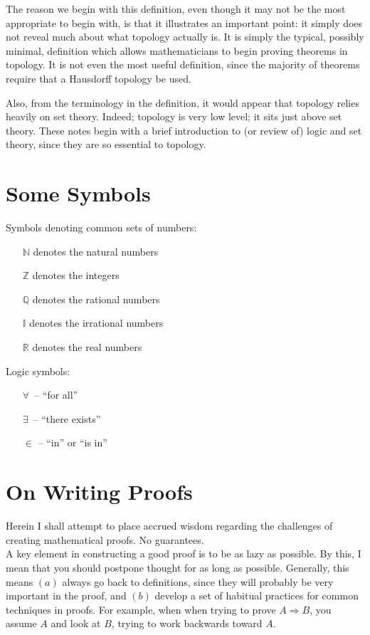 \documentclass[12pt]{report}
\newcommand{\fall}{\forall\,}
\newcommand{\exst}{\exists\,}
\newcommand{\reals}{\mathbb{R}}
\newcommand{\naturals}{\mathbb{N}}
\newcommand{\rationals}{\mathbb{Q}}
\newcommand{\integers}{\mathbb{Z}}
\newcommand{\irrationals}{\mathbb{I}}
\begin{document}
The reason we begin with this definition, even though it may not be the most
appropriate to begin with, is that it illustrates an important point: it
simply does not reveal much about what topology actually is. It is simply the
typical, possibly minimal, definition which allows mathematicians to begin
proving theorems in topology. It is not even the most useful definition, since
the majority of theorems require that a Hausdorff topology be used.

Also, from the terminology in the definition, it would appear that topology
relies heavily on set theory. Indeed; topology is very low level; it sits just
above set theory.  These notes begin with a brief introduction to (or review
of) logic and set theory, since they are so essential to topology.

\section{Some Symbols}

Symbols denoting common sets of numbers:
\begin{itemize}
\item[$\naturals$] denotes the natural numbers
\item[$\integers$] denotes the integers
\item[$\rationals$] denotes the rational numbers
\item[$\irrationals$] denotes the irrational numbers
\item[$\reals$] denotes the real numbers
\end{itemize}


\noindent
Logic symbols:
\begin{itemize}
\item[$\fall$] -- ``for all''
\item[$\exst$] -- ``there exists''
\item[$\in$] -- ``in'' or ``is in''
\end{itemize}

\section{On Writing Proofs}

Herein I shall attempt to place accrued wisdom regarding the challenges of
creating mathematical proofs. No guarantees.\\

A key element in constructing a good proof is to be as lazy as possible. By
this, I mean that you should postpone thought for as long as possible.
Generally, this means $(a)$ always go back to definitions, since they will
probably be very important in the proof, and $(b)$ develop a set of habitual
practices for common techniques in proofs. For example, when when trying to
prove $A \Rightarrow B$, you assume $A$ and look at $B$, trying to work
backwards toward $A$.
\end{document}
